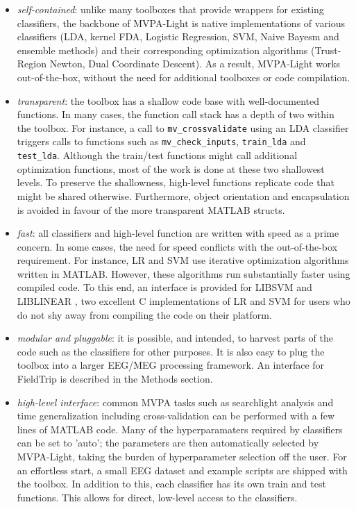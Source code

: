 \documentclass[utf8]{frontiersSCNS} %
\begin{document}
\begin{itemize}
\item \textit{self-contained}: unlike many toolboxes that provide wrappers for existing classifiers, the backbone of MVPA-Light is  native implementations of various classifiers (LDA, kernel FDA, Logistic Regression, SVM, Naive Bayesm and ensemble methods) and their corresponding optimization algorithms (Trust-Region Newton, Dual Coordinate Descent). As a result, MVPA-Light works out-of-the-box, without the need for additional toolboxes or  code compilation.
\item \textit{transparent}: the toolbox has a shallow code base with well-documented functions. In many cases, the function call stack has a depth of two within the toolbox. For instance, a call to \texttt{mv\_crossvalidate} using an LDA classifier triggers calls to functions such as  \texttt{mv\_check\_inputs}, \texttt{train\_lda} and \texttt{test\_lda}. Although the train/test functions might call additional optimization functions, most of the work is done at these two shallowest levels. To preserve the shallowness, high-level functions replicate code that might be shared otherwise. Furthermore, object orientation and encapsulation is avoided in favour of the more transparent MATLAB structs.
\item \textit{fast}: all classifiers and high-level function are written with speed as a prime concern. In some cases, the need for speed conflicts with the out-of-the-box requirement. For instance, LR and SVM use iterative optimization algorithms written in MATLAB. However, these algorithms run substantially faster using compiled code. To this end, an interface is provided for LIBSVM \citep{Chang2011LIBSVM:Machines} and LIBLINEAR \citep{Fan2008}, two excellent C implementations of LR and SVM for users who do not shy away from compiling the code on their platform.
\item \textit{modular and pluggable}: it is possible, and intended, to harvest parts of the code such as the classifiers for other purposes. It is also easy to plug the toolbox into a larger EEG/MEG processing framework. An interface for FieldTrip \citep{Oostenveld2011} is described in the Methods section.
\item \textit{high-level interface}: common MVPA tasks such as searchlight analysis and time generalization including cross-validation can be performed with a few lines of MATLAB code. Many of the hyperparamaters required by classifiers can be set to 'auto'; the parameters are then automatically selected by MVPA-Light, taking the burden of hyperparameter selection off the user. For an effortless start, a small EEG dataset and example scripts are shipped with the toolbox. In addition to this, each classifier has its own train and test functions. This allows for direct, low-level access to the classifiers. 
\end{itemize}
\end{document}
